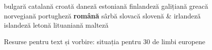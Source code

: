 \begin{figure}[tb]
\begin{tabular}
bulgară\newline 
catalană \newline 
croată \newline 
daneză \newline 
estoniană \newline 
finlandeză \newline 
galițiană \newline 
greacă \newline 
norvegiană \newline 
portugheză \newline 
\textbf{română} \newline 
sârbă \newline 
slovacă \newline 
slovenă \newline
& \vspace*{0.5mm} irlandeză \newline 
islandeză \newline 
letonă \newline 
lituaniană \newline 
malteză \\
\end{tabular}
\caption{Resurse pentru text și vorbire: situația pentru 30 de limbi europene}
\label{fig:resources_cluster_de}
\end{figure}

\clearpage



